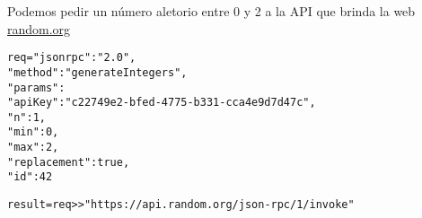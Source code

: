 \documentclass[12pt,a4paper,final]{article}
\begin{document}
\begin{description}
\begin{itemize}
\clearpage 
Podemos pedir un número aletorio entre 0 y 2 a la API que brinda la web \url{random.org}
\begin{alltt}
req = \textbraceleft "jsonrpc": "2.0",
        "method": "generateIntegers",
        "params":
         {\textbraceleft} "apiKey": "c22749e2-bfed-4775-b331-cca4e9d7d47c",
           "n": 1,
           "min": 0,
           "max": 2,
           "replacement": true {\textbraceright},
        "id": 42 \textbraceright 
        
result = req >> "https://api.random.org/json-rpc/1/invoke"
\end{alltt} 
\end{itemize}
\end{description}

\printindex
\end{document}
